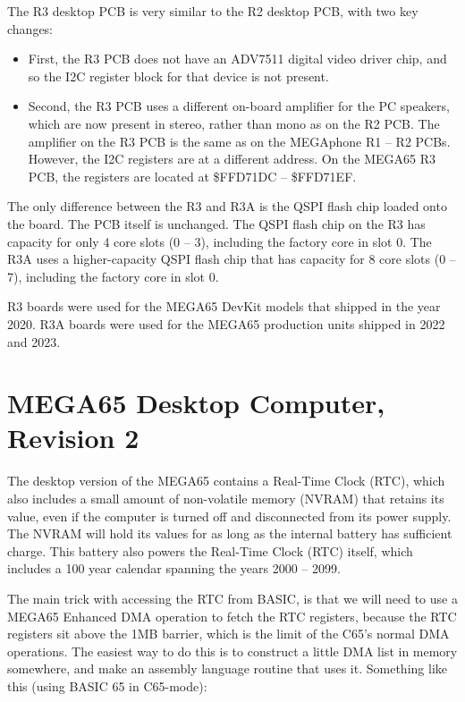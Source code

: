 The R3 desktop PCB is very similar to the R2 desktop PCB, with two key changes:

\begin{itemize}
\item First, the R3 PCB does not have an ADV7511 digital video driver chip, and so the I2C register block for that device is not present.
\item Second, the R3 PCB uses a different on-board amplifier for the PC speakers, which are now present in stereo, rather than mono
  as on the R2 PCB.  The amplifier on the R3 PCB is the same as on the MEGAphone R1 -- R2 PCBs.
  However, the I2C registers are at a different address.  On the MEGA65 R3 PCB, the registers are located at \$FFD71DC -- \$FFD71EF.
\end{itemize}

The only difference between the R3 and R3A is the QSPI flash chip loaded onto the board. The PCB itself is unchanged. The QSPI flash chip on the R3 has capacity for only 4 core slots (0 -- 3), including the factory core in slot 0.  The R3A uses a higher-capacity QSPI flash chip that has capacity for 8 core slots (0 -- 7), including the factory core in slot 0.

R3 boards were used for the MEGA65 DevKit models that shipped in the year 2020. R3A boards were used for the MEGA65 production units shipped in 2022 and 2023.



\section{MEGA65 Desktop Computer, Revision 2}

The desktop version of the MEGA65 contains a Real-Time Clock (RTC), which also includes a small amount of non-volatile memory (NVRAM)
that retains its value, even if the computer is turned off and disconnected from its power supply. The NVRAM will hold its values
for as long as the internal battery has sufficient charge.  This battery also powers the Real-Time Clock (RTC) itself, which includes
a 100 year calendar spanning the years 2000 -- 2099.

The main trick with accessing the RTC from BASIC, is that we will need to use a MEGA65 Enhanced DMA operation to fetch the RTC registers, because the RTC registers sit above the 1MB barrier, which is the limit of the C65's normal DMA operations.  The easiest way to do this is to construct a little DMA list in memory somewhere, and make an assembly language routine that uses it.  Something like this (using BASIC 65 in C65-mode):

